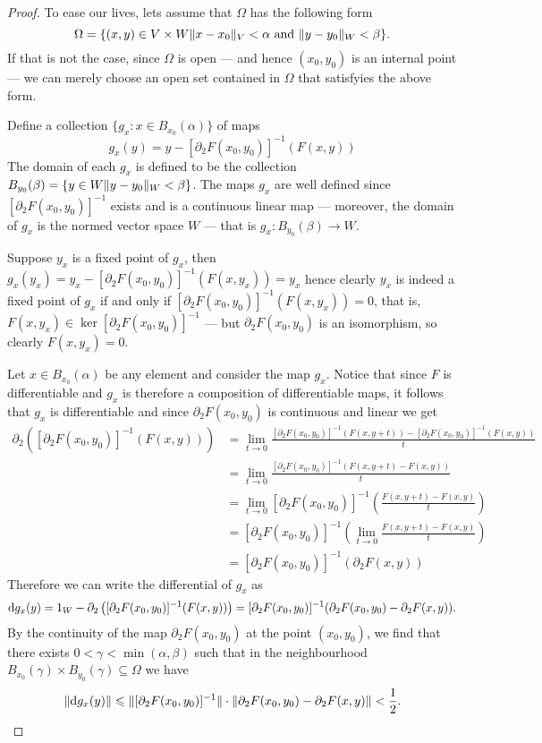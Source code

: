 \begin{proof}
To ease our lives, lets assume that \(\Omega\) has the following form
\[
  \Omega = \{(x, y) \in V \times W \relax \lVert x - x_{0}\rVert_{V} < \alpha
  \text{ and } \lVert y - y_0\rVert_W < \beta\}.
\]
If that is not the case, since \(\Omega\) is open --- and hence \((x_{0}, y_0)\) is
an internal point --- we can merely choose an open set contained in \(\Omega\) that
satisfyies the above form.

Define a collection \(\{g_{x} \colon x \in B_{x_0}(\alpha)\}\) of maps
\[
  g_{x}(y) = y - [\partial_2F(x_0, y_0)]^{-1} (F(x, y))
\]
The domain of each \(g_x\) is defined to be the collection \(B_{y_0}(\beta) = \{y
\in W \relax \lVert y - y_0\rVert_W < \beta\}\). The maps \(g_{x}\) are well defined since
\([\partial_2F(x_0, y_0)]^{-1}\) exists and is a continuous linear map --- moreover, the
domain of \(g_x\) is the normed vector space \(W\) --- that is \(g_x: B_{y_0}(\beta) \to
W\).

Suppose \(y_x\) is a fixed point of \(g_x\), then \(g_x(y_x) = y_x -
[\partial_2F(x_0, y_0)]^{-1}(F(x, y_x)) = y_{x}\) hence clearly \(y_x\) is indeed a
fixed point of \(g_x\) if and only if \([\partial_2F(x_0, y_0)]^{-1}(F(x, y_x)) =
0\), that is, \(F(x, y_x) \in \ker [\partial_2F(x_0, y_0)]^{-1}\) --- but \(\partial_2 F(x_0,
y_0)\) is an isomorphism, so clearly \(F(x, y_x) = 0\).

Let \(x \in B_{x_0}(\alpha)\) be any element and consider the map \(g_x\). Notice
that since \(F\) is differentiable and \(g_{x}\) is therefore a composition of
differentiable maps, it follows that \(g_x\) is differentiable and since \(\partial_2
F(x_0, y_0)\) is continuous and linear we get
\begin{align*}
  \partial_2 \left( [\partial_2F(x_0, y_0)]^{-1}(F(x, y)) \right)
  &= \lim_{t \to 0} \frac{[\partial_{2}F(x_0, y_0)]^{-1}(F(x, y + t)) - [\partial_2F(x_0,
    y_0)]^{-1}(F(x, y))}{t}
  \\
  &= \lim_{t \to 0} \frac{[\partial_2F(x_0, y_{0})]^{-1}(F(x, y + t) - F(x, y))}{t}
  \\
  &= \lim_{t \to 0} [\partial_2F(x_0, y_0)]^{-1}
    \left( \frac{F(x, y + t) - F(x, y)}{t} \right)
  \\
  &= [\partial_2F(x_0, y_0)]^{-1}
    \left( \lim_{t \to 0} \frac{F(x, y + t) - F(x, y)}{t} \right)
  \\
  &= [\partial_{2}F(x_0, y_0)]^{-1}(\partial_2 F(x, y))
\end{align*}
Therefore we can write the differential of \(g_{x}\) as
\[
  \mathrm{d} g_x(y) = 1_W - \partial_{2}\left([\partial_2F(x_0, y_0)]^{-1}(F(x, y))\right)
  = [\partial_2F(x_0, y_0)]^{-1}(\partial_2F(x_0, y_0) - \partial_2F(x, y)).
\]
By the continuity of the map \(\partial_2F(x_0, y_0)\) at the point \((x_0, y_0)\),
we find that there exists \(0 < \gamma < \min(\alpha, \beta)\) such that in the neighbourhood
\(B_{x_0}(\gamma) \times B_{y_0}(\gamma) \subseteq \Omega\) we have
\[
  \lVert\mathrm{d} g_x(y)\rVert \leqslant \lVert[\partial_{2}F(x_0, y_0)]^{-1}\rVert \cdot \lVert\partial_2F(x_0, y_0) -
    \partial_2F(x, y)\rVert < \frac{1}{2}.
\]


\end{proof}
